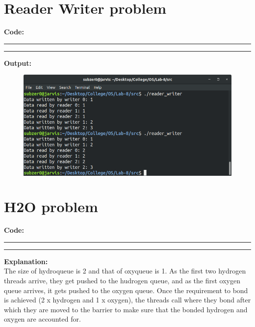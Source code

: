 \documentclass{article}
\begin{document}
\section*{Reader Writer problem}

\par\noindent
\textbf{\Large Code:}
\smallskip
\par\noindent\rule{\textwidth}{0.4pt}

\par\noindent\rule{\textwidth}{0.4pt}

\bigskip
\noindent
\textbf{\Large Output:}

\begin{figure}[h]
	\includegraphics[width=\textwidth]{output/reader_writer.png}
\end{figure}
\bigskip
\pagebreak

\section*{H2O problem}
\par\noindent
\textbf{\Large Code:}
\smallskip
\par\noindent\rule{\textwidth}{0.4pt}

\par\noindent\rule{\textwidth}{0.4pt}

\bigskip
\noindent
\textbf{\Large Explanation: } \\

The size of hydroqueue is 2 and that of oxyqueue is 1. As the first two hydrogen threads arrive, they
get pushed to the hudrogen queue, and as the first oxygen queue arrives, it gets pushed to the oxygen
queue. Once the requirement to bond is achieved (2 x hydrogen and 1 x oxygen), the threads call where 
they bond after which they are moved to the barrier to make sure that the bonded hydrogen and oxygen
are accounted for.
\end{document}
